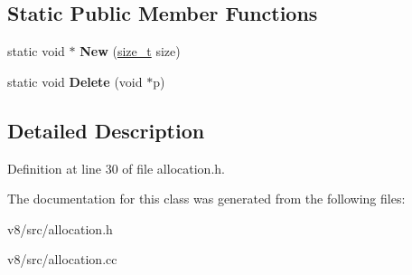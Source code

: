 \subsection*{Static Public Member Functions}
\begin{DoxyCompactItemize}
\item 
\mbox{\label{classv8_1_1internal_1_1Malloced_a20e13f78edcc04c7bb514c0659dc49fa}} 
static void $\ast$ {\bfseries New} (\mbox{\hyperlink{classsize__t}{size\+\_\+t}} size)
\item 
\mbox{\label{classv8_1_1internal_1_1Malloced_ace0f2f3fe0407b68f037360431dfc30a}} 
static void {\bfseries Delete} (void $\ast$p)
\end{DoxyCompactItemize}


\subsection{Detailed Description}


Definition at line 30 of file allocation.\+h.



The documentation for this class was generated from the following files\+:\begin{DoxyCompactItemize}
\item 
v8/src/allocation.\+h\item 
v8/src/allocation.\+cc\end{DoxyCompactItemize}
